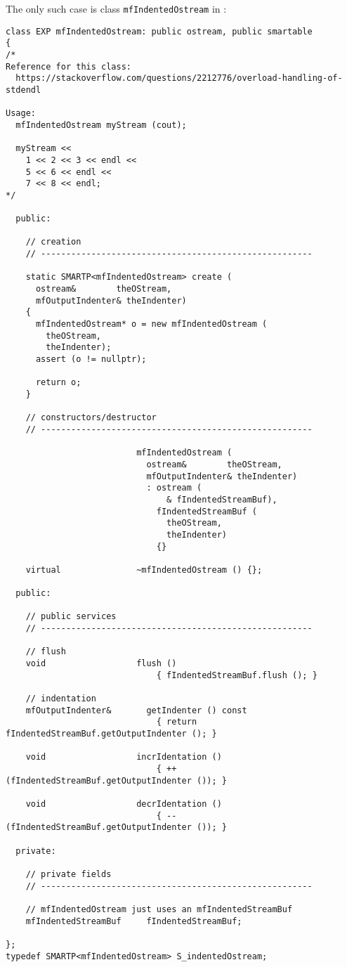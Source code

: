 The only such case is class {\tt mfIndentedOstream} in :
\begin{lstlisting}[language=CPlusPlus]
class EXP mfIndentedOstream: public ostream, public smartable
{
/*
Reference for this class:
  https://stackoverflow.com/questions/2212776/overload-handling-of-stdendl

Usage:
  mfIndentedOstream myStream (cout);

  myStream <<
    1 << 2 << 3 << endl <<
    5 << 6 << endl <<
    7 << 8 << endl;
*/

  public:

    // creation
    // ------------------------------------------------------

    static SMARTP<mfIndentedOstream> create (
      ostream&        theOStream,
      mfOutputIndenter& theIndenter)
    {
      mfIndentedOstream* o = new mfIndentedOstream (
        theOStream,
        theIndenter);
      assert (o != nullptr);

      return o;
    }

    // constructors/destructor
    // ------------------------------------------------------

                          mfIndentedOstream (
                            ostream&        theOStream,
                            mfOutputIndenter& theIndenter)
                            : ostream (
                                & fIndentedStreamBuf),
                              fIndentedStreamBuf (
                                theOStream,
                                theIndenter)
                              {}

    virtual               ~mfIndentedOstream () {};

  public:

    // public services
    // ------------------------------------------------------

    // flush
    void                  flush ()
                              { fIndentedStreamBuf.flush (); }

    // indentation
    mfOutputIndenter&       getIndenter () const
                              { return fIndentedStreamBuf.getOutputIndenter (); }

    void                  incrIdentation ()
                              { ++ (fIndentedStreamBuf.getOutputIndenter ()); }

    void                  decrIdentation ()
                              { -- (fIndentedStreamBuf.getOutputIndenter ()); }

  private:

    // private fields
    // ------------------------------------------------------

    // mfIndentedOstream just uses an mfIndentedStreamBuf
    mfIndentedStreamBuf     fIndentedStreamBuf;

};
typedef SMARTP<mfIndentedOstream> S_indentedOstream;
\end{lstlisting}


